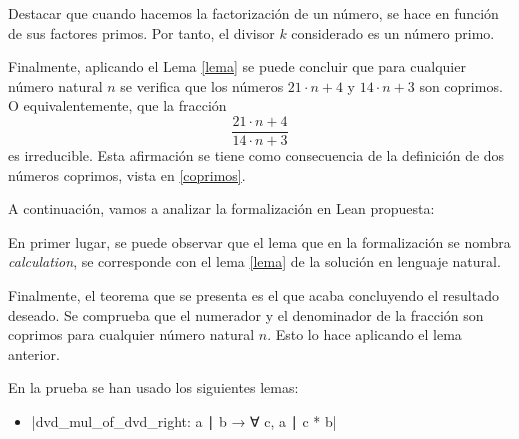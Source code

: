 Destacar que cuando hacemos la factorización de un número, se hace en
función de sus factores primos. Por tanto, el divisor \(k\) considerado
es un número primo.

Finalmente, aplicando el Lema \ref{lema} se puede concluir que para
cualquier número natural \(n\) se verifica que los números \(21⋅n+4\)
y \(14⋅n+3\) son coprimos. O equivalentemente, que la fracción
\begin{equation*}
  \frac{21⋅n+4}{14⋅n+3}
\end{equation*}
es irreducible. Esta afirmación se tiene como consecuencia de la
definición de dos números coprimos, vista en \ref{coprimos}.

A continuación, vamos a analizar la formalización en Lean propuesta:


En primer lugar, se puede observar que el lema que en la
formalización se nombra \textit{calculation}, se corresponde con
el lema \ref{lema} de la solución en lenguaje natural.

Finalmente, el teorema que se presenta es el que acaba concluyendo
el resultado deseado. Se comprueba que el numerador y el denominador
de la fracción son coprimos para cualquier número natural \(n\).
Esto lo hace aplicando el lema anterior.





En la prueba se han usado los siguientes lemas:
\begin{itemize}
\item {}|dvd_mul_of_dvd_right: a ∣ b → ∀ c, a ∣ c * b|
\end{itemize}




